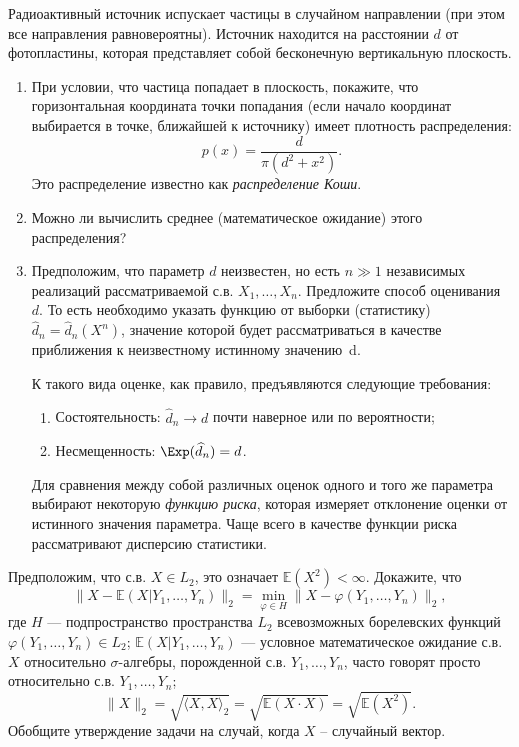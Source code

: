 \begin{problem}
Радиоактивный источник испускает 
частицы в случайном направлении (при этом все направления равновероятны). 
Источник находится на расстоянии $d$ от фотопластины, которая представляет 
собой бесконечную вертикальную плоскость.

\begin{enumerate}
\item При условии, что частица попадает в плоскость, покажите, что 
горизонтальная координата точки попадания (если начало координат выбирается 
в точке, ближайшей к источнику) имеет плотность распределения:
\[
p\left( x \right)=\frac{d}{\pi \left( {d^2+x^2} \right)}.
\]
Это распределение известно как \textit{распределение Коши}.

\item Можно ли вычислить среднее (математическое ожидание) этого 
распределения?

\item Предположим, что параметр $d$ неизвестен, но есть $n \gg 1$ независимых реализаций рассматриваемой с.в. $X_1, \ldots, X_n$. Предложите способ оценивания $d$. То есть необходимо указать функцию от выборки (статистику) $\widehat d_n=\widehat d_n(X^n)$,
значение которой будет рассматриваться в качестве приближения к неизвестному истинному значению~d. 
\begin{remark}
К такого вида оценке, как правило, предъявляются следующие требования:
\begin{enumerate}
\item Состоятельность: $\widehat d_n \rightarrow d$ почти наверное или по вероятности;
\item Несмещенность: $\Exp(\widehat d_n) = d$.
\end{enumerate}

Для сравнения между собой различных оценок одного и того же параметра выбирают некоторую \textit{функцию риска}, которая измеряет отклонение оценки от истинного значения параметра.
Чаще всего в качестве функции риска рассматривают дисперсию статистики. 
\end{remark}

\end{enumerate}
\end{problem}

\begin{problem}
\label{condExp1}
Предположим, что с.в. $X\in L_2$, это означает ${\mathbb E}(X^2)<\infty$. Докажите, что 
\begin{equation*}
\label{UMO}\tag{E}
\| X-{\mathbb E}(X|Y_1,\ldots,Y_n)\|_{2}=\min\limits_{\varphi\in H} \| X-\varphi(Y_1,\ldots,Y_n)\|_{2} , 
\end{equation*}
где $H$ --- подпространство пространства $L_2$ всевозможных борелевских функций $\varphi(Y_1,\ldots,Y_n)\in L_2$; 
${\mathbb E}(X|Y_1,\ldots,Y_n)$ --- условное математическое ожидание с.в. $X$ относительно $\sigma$-алгебры, порожденной с.в. 
$Y_1,\ldots,Y_n$, часто говорят просто относительно с.в. $Y_1,\ldots,Y_n$; 
$$
\| X\|_{2}=\sqrt{\langle X,X\rangle_{2}}=\sqrt{{\mathbb E}(X\cdot X)}=\sqrt{{\mathbb E}(X^2)} . 
$$
Обобщите утверждение задачи на случай, когда $X$ -- случайный вектор.
\end{problem}



